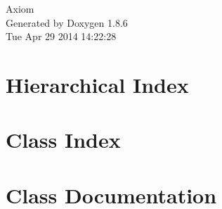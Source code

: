 \documentclass[twoside]{book}
\newcommand{\clearemptydoublepage}{%
  \newpage{\pagestyle{empty}\cleardoublepage}%
}
\begin{document}
\hypersetup{pageanchor=false}
\begin{titlepage}
\vspace*{7cm}
\begin{center}%
{\Large Axiom }\\
\vspace*{1cm}
{\large Generated by Doxygen 1.8.6}\\
\vspace*{0.5cm}
{\small Tue Apr 29 2014 14:22:28}\\
\end{center}
\end{titlepage}
\clearemptydoublepage
\tableofcontents
\clearemptydoublepage
{}
\hypersetup{pageanchor=true}

\chapter{Hierarchical Index}

\chapter{Class Index}

\chapter{Class Documentation}






































\newpage
{}
{}
\printindex
\end{document}
